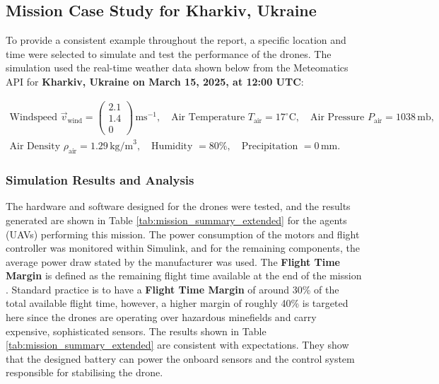 \subsection{Mission Case Study for Kharkiv, Ukraine}
\label{mocs}

To provide a consistent example throughout the report, a specific location and time were selected to simulate and test the performance of the drones. The simulation used the real-time weather data shown below from the Meteomatics API for \textbf{Kharkiv, Ukraine on March 15, 2025, at 12:00 UTC}: \vspace{-3em}

\begin{gather*}
\text{Windspeed } \vec{v}_{\text{wind}} = \begin{pmatrix}2.1 \\ 1.4 \\ 0\end{pmatrix}\,\text{ms}^{-1},\quad 
\text{Air Temperature } T_{\text{air}} = 17^\circ\text{C},\quad 
\text{Air Pressure } P_{\text{air}} = 1038\,\text{mb}, \\
\text{Air Density } \rho_{\text{air}} = 1.29\,\text{kg/m}^3,\quad 
\text{Humidity } = 80\%,\quad 
\text{Precipitation } = 0\,\text{mm}.
\end{gather*}

\subsubsection{Simulation Results and Analysis}
\label{simdata}

The hardware and software designed for the drones were tested, and the results generated are shown in Table \ref{tab:mission_summary_extended} for the agents (\gls{UAV}s) performing this mission. The power consumption of the motors and flight controller was monitored within Simulink, and for the remaining components, the average power draw stated by the manufacturer was used. The \textbf{Flight Time Margin} is defined as the remaining flight time available at the end of the mission \cite{technologies11010012}. Standard practice is to have a \textbf{Flight Time Margin} of around 30\% of the total available flight time, however, a higher margin of roughly 40\% is targeted here since the drones are operating over hazardous minefields and carry expensive, sophisticated sensors. The results shown in Table \ref{tab:mission_summary_extended} are consistent with expectations. They show that the designed battery can power the onboard sensors and the control system responsible for stabilising the drone.

